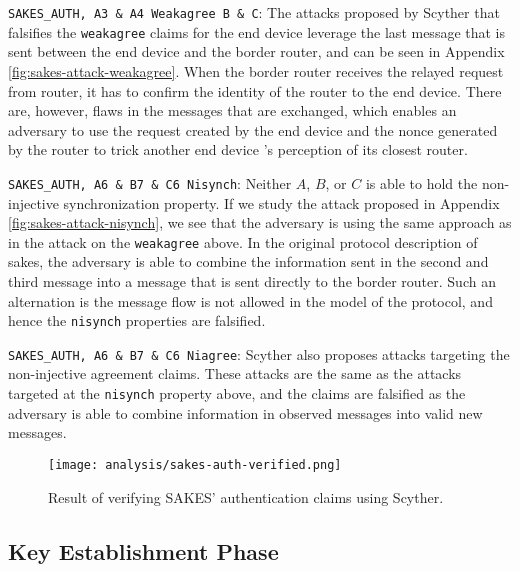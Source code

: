\begin{list}{•}{}

\item \texttt{SAKES\_AUTH, A3 \& A4 Weakagree B \& C}: The attacks proposed by Scyther that falsifies the \texttt{weakagree} claims for the end device leverage the last message that is sent between the end device and the border router, and can be seen in Appendix \ref{fig:sakes-attack-weakagree}. When the border router receives the relayed request from router, it has to confirm the identity of the router to the end device. There are, however, flaws in the messages that are exchanged, which enables an adversary to use the request created by the end device and the nonce generated by the router to trick another end device 's perception of its closest router.

\item \texttt{SAKES\_AUTH, A6 \& B7 \& C6 Nisynch}: Neither $A$, $B$, or $C$ is able to hold the non-injective synchronization property. If we study the attack proposed in Appendix \ref{fig:sakes-attack-nisynch}, we see that the adversary is using the same approach as in the attack on the \texttt{weakagree} above. In the original protocol description of \gls{sakes}, the adversary is able to combine the information sent in the second and third message into a message that is sent directly to the border router. Such an alternation is the message flow is not allowed in the model of the protocol, and hence the \texttt{nisynch} properties are falsified.

\item \texttt{SAKES\_AUTH, A6 \& B7 \& C6 Niagree}: Scyther also proposes attacks targeting the non-injective agreement claims. These attacks are the same as the attacks targeted at the \texttt{nisynch} property above, and the claims are falsified as the adversary is able to combine information in observed messages into valid new messages.

\end{list}

\begin{figure}[h]
	\centering
	\texttt{[image: analysis/sakes-auth-verified.png]}
	\caption{Result of verifying SAKES' authentication claims using Scyther.}
	\label{fig:sakes-verified-auth}
\end{figure}

\newpage

\subsection{Key Establishment Phase}

